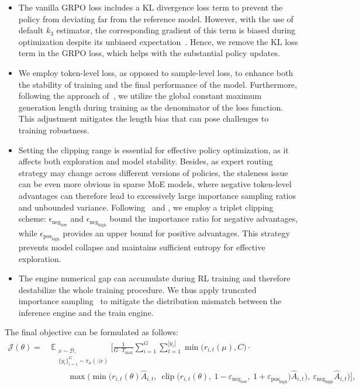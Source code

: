 \begin{itemize}
    \item The vanilla GRPO loss includes a KL divergence loss term to prevent the policy from deviating far from the reference model. However, with the use of default $k_3$ estimator, the corresponding gradient of this term is biased during optimization despite its unbiased expectation~\citep{zang2025KLGRPO}. Hence, we remove the KL loss term in the GRPO loss, which helps with the substantial policy updates. 
    \item We employ token-level loss, as opposed to sample-level loss, to enhance both the stability of training and the final performance of the model. Furthermore, following the approach of~\citet{dr_grpo}, we utilize the global constant maximum generation length during training as the denominator of the loss function. This adjustment mitigates the length bias that can pose challenges to training robustness.
    \item Setting the clipping range is essential for effective policy optimization, as it affects both exploration and model stability. Besides, as expert routing strategy may change across different versions of policies, the staleness issue can be even more obvious in sparse MoE models, where negative token-level advantages can therefore lead to excessively large importance sampling ratios and unbounded variance. 
    Following~\citet{dapo} and \citet{tencent_moba}, we employ a triplet clipping scheme: $\epsilon_{\text{neg}_\text{low}}$ and $\epsilon_{\text{neg}_\text{high}}$ bound the importance ratio for negative advantages, while $\epsilon_{\text{pos}_\text{high}}$ provides an upper bound for positive advantages. This strategy prevents model collapse and maintains sufficient entropy for effective exploration.
    \item The engine numerical gap can accumulate during RL training and therefore destabilize the whole training procedure. We thus apply truncated importance sampling~\citep{off-policy-rl, ionides2008truncated} to mitigate the distribution mismatch between the inference engine and the train engine.
\end{itemize}
The final objective can be formulated as follows:
\begin{equation}
\begin{aligned}
\mathcal{J}(\theta) =\ 
&\mathbb{E}_{\substack{x\sim\mathcal{D},\\\{y_i\}_{i=1}^G\sim\pi_{\mu}(\cdot|x)}}\Bigg[ 
    \frac{1}{G\cdot T_\text{max}} 
    \sum_{i=1}^G \sum_{t=1}^{|y_i|} 
    \min\bigg(r_{i,t}(\mu),C\bigg)\cdot \\
&\qquad\max\Bigg(
        \min \Big(
            r_{i, t}(\theta) \hat{A}_{i, t},\ 
            \operatorname{clip}\big(
                r_{i, t}(\theta),\ 1-\varepsilon_{\text{neg}_\text{low}},\ 1+\varepsilon_{\text{pos}_\text{high}}
            \big) \hat{A}_{i, t}
        \Big),\ 
        \varepsilon_{\text{neg}_\text{high}}\hat{A}_{i, t}
    \Bigg)
\Bigg],
\end{aligned}
\end{equation}
